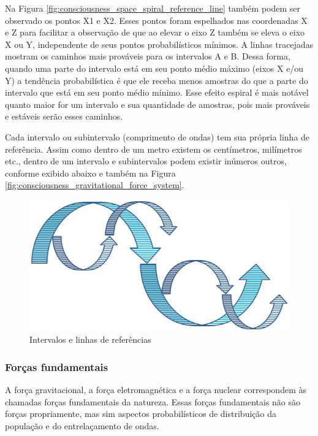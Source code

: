 Na Figura \ref{fig:consciousness_space_spiral_reference_line} também podem ser observado os pontos X1 e X2. Esses pontos foram espelhados nas coordenadas X e Z para facilitar a observação de que ao elevar o eixo Z também se eleva o eixo X ou Y, independente de seus pontos probabilísticos mínimos. A linhas tracejadas mostram os caminhos mais prováveis para os intervalos A e B. Dessa forma, quando uma parte do intervalo está em seu ponto médio máximo (eixos X e/ou Y) a tendência probabilística é que ele receba menos amostras do que a parte do intervalo que está em seu ponto médio mínimo. Esse efeito espiral é mais notável quanto maior for um intervalo e sua quantidade de amostras, pois mais prováveis e estáveis serão esses caminhos.

Cada intervalo ou subintervalo (comprimento de ondas) tem sua própria linha de referência. Assim como dentro de um metro existem os centímetros, milímetros etc., dentro de um intervalo e subintervalos podem existir inúmeros outros, conforme exibido abaixo e também na Figura \ref{fig:consciousness_gravitational_force_system}.
	\begin{figure}[H]
	\caption{Intervalos e linhas de referências}
	\label{fig:consciousness_space_spiral_underlines}
	\centering
	\includegraphics[scale=.5]{sections/images/consciousness_space_spiral_underlines.jpg}
	\end{figure}

\subsubsection{Forças fundamentais}
A força gravitacional, a força eletromagnética e a força nuclear correspondem às chamadas forças fundamentais da natureza. Essas forças fundamentais não são forças propriamente, mas sim aspectos probabilísticos de distribuição da população e do entrelaçamento de ondas.

